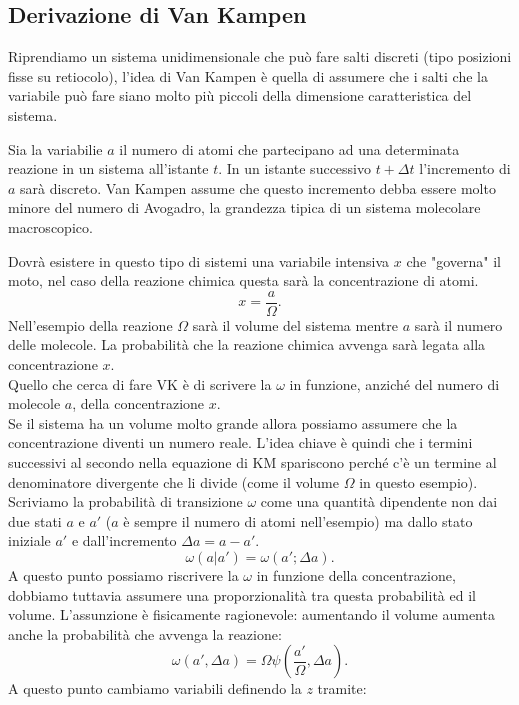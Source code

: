 \subsection{Derivazione di Van Kampen}%
\label{sub:Derivazione di Van Kampen}
Riprendiamo un sistema unidimensionale che può fare salti discreti (tipo posizioni fisse su retiocolo), l'idea di Van Kampen è quella di assumere che i salti che la variabile può fare siano molto più piccoli della dimensione caratteristica del sistema.
\begin{exmp}
    Sia la variabilie $a$ il numero di atomi che partecipano ad una determinata reazione in un sistema all'istante $t$. In un istante successivo $t+\Delta t$ l'incremento di $a$ sarà discreto. Van Kampen assume che questo incremento debba essere molto minore del numero di Avogadro, la grandezza tipica di un sistema molecolare macroscopico.
\end{exmp}
\noindent
Dovrà esistere in questo tipo di sistemi una variabile intensiva $x$ che "governa" il moto, nel caso della reazione chimica questa sarà la concentrazione di atomi.
\[
    x = \frac{a}{\Omega}
.\] 
Nell'esempio della reazione $\Omega$ sarà il volume del sistema mentre $a$ sarà il numero delle molecole. La probabilità che la reazione chimica avvenga sarà legata alla concentrazione $x$.\\
Quello che cerca di fare VK è di scrivere la $\omega$ in funzione, anziché del numero di molecole $a$, della concentrazione $x$.\\
Se il sistema ha un volume molto grande allora possiamo assumere che la concentrazione diventi un numero reale. L'idea chiave è quindi che i termini successivi al secondo nella equazione di KM spariscono perché c'è un termine al denominatore divergente che li divide (come il volume $\Omega$ in questo esempio).\\
Scriviamo la probabilità di transizione $\omega$ come una quantità dipendente non dai due stati $a$ e $a'$ ($a$ è sempre il numero di atomi nell'esempio) ma dallo stato iniziale $a'$ e dall'incremento $\Delta a = a-a'$.
\[
    \omega\left(a|a'\right) = \omega(a'; \Delta a) 
.\] 
A questo punto possiamo riscrivere la $\omega$ in funzione della concentrazione, dobbiamo tuttavia assumere una proporzionalità tra questa probabilità ed il volume. L'assunzione è fisicamente ragionevole: aumentando il volume aumenta anche la probabilità che avvenga la reazione:
\[
    \omega (a', \Delta  a) = \Omega  \psi\left(\frac{a'}{\Omega}, \Delta a\right)
.\] 
A questo punto cambiamo variabili definendo la $z$ tramite:
